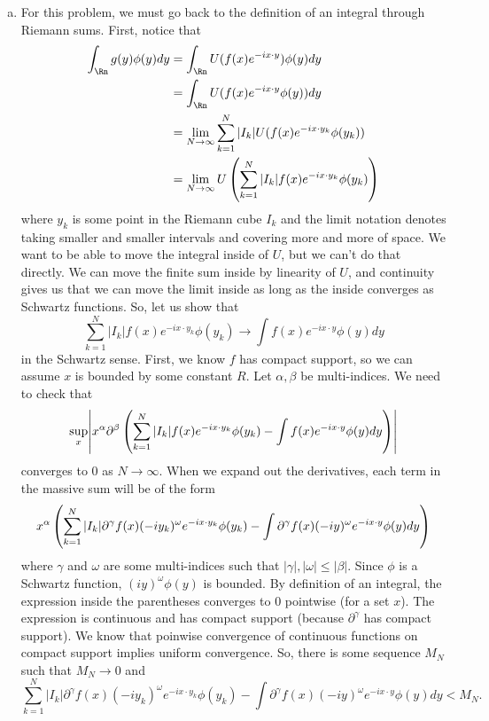 \documentclass{article}
\renewcommand{\d}{\partial}
\begin{document}
\newpage
{} 
 \tri
\hop 
\solution
\begin{enumerate}[(a)]
    \item For this problem, we must go back to the definition of an integral through Riemann sums. First, notice that 
    \begin{align*}
        \int_\Rn g(y)\phi(y)dy &= \int_\Rn U(f(x)e^{-i x \cdot y})\phi(y) dy \\
        &= \int_\Rn U(f(x)e^{-i x \cdot y}\phi(y)) dy \\
        &= \lim_{N \to \infty} \sum^N_{k=1} |I_k| U(f(x)e^{-i x \cdot y_k}\phi(y_k))\\
        &= \lim_{N \to \infty}  U\del{\sum^N_{k=1} |I_k| f(x)e^{-i x \cdot y_k}\phi(y_k)}
    \end{align*}
    where $y_k$ is some point in the Riemann cube $I_k$ and the limit notation denotes taking smaller and smaller intervals and covering more and more of space. 
    \hop 
    We want to be able to move the integral inside of $U$, but we can't do that directly. We can move the finite sum inside by linearity of $U$, and continuity gives us that we can move the limit inside as long as the inside converges as Schwartz functions. So, let us show that 
    \[\sum^N_{k=1} |I_k|f(x)e^{-i x \cdot y_k}\phi(y_k) \to \int f(x)e^{-ix \cdot y} \phi(y)dy\]
    in the Schwartz sense. First, we know $f$ has compact support, so we can assume $x$ is bounded by some constant $R$. Let $\alpha, \beta$ be multi-indices. We need to check that 
    \[\sup_x\abs{x^\alpha \d^\beta \del{\sum^N_{k=1} |I_k|f(x)e^{-i x \cdot y_k}\phi(y_k) - \int f(x)e^{-ix \cdot y} \phi(y)dy}}\]
    converges to 0 as $N \to \infty$. When we expand out the derivatives, each term in the massive sum will be of the form 
    \[x^\alpha  \del{\sum_{k=1}^N |I_k|\d^\gamma f(x)(-iy_k)^\omega e^{-ix \cdot y_k} \phi(y_k) - \int \d^\gamma f(x) (-iy)^\omega  e^{-ix \cdot y}\phi(y) dy}\]
    where $\gamma$ and $\omega$ are some multi-indices such that $|\gamma|, |\omega| \le |\beta|$. Since $\phi$ is a Schwartz function, $(iy)^\omega \phi(y)$ is bounded. By definition of an integral, the expression inside the parentheses converges to 0 pointwise (for a set $x$). The expression is continuous and has compact support (because $\d^\gamma$ has compact support). We know that poinwise convergence of continuous functions on compact support implies uniform convergence. So, there is some sequence $M_N$ such that $M_N \to 0$ and 
    \[\sum_{k=1}^N |I_k|\d^\gamma f(x)(-iy_k)^\omega e^{-ix \cdot y_k} \phi(y_k) - \int \d^\gamma f(x) (-iy)^\omega e^{-ix \cdot y}\phi(y) dy < M_N.\]

\end{enumerate}
\end{document}
